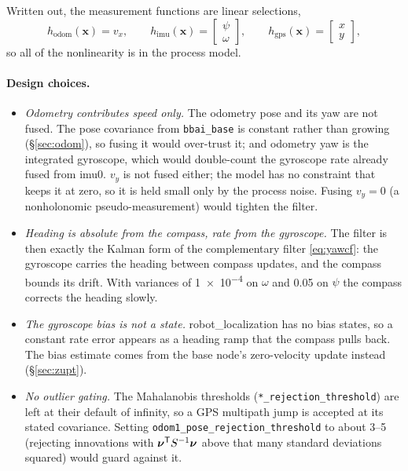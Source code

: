 Written out, the measurement functions are linear selections,
\begin{equation}
h_{\mathrm{odom}}(\bm x)=v_x,\qquad
h_{\mathrm{imu}}(\bm x)=\begin{bmatrix}\psi\\\omega\end{bmatrix},\qquad
h_{\mathrm{gps}}(\bm x)=\begin{bmatrix}x\\y\end{bmatrix},
\end{equation}
so all of the nonlinearity is in the process model.

\paragraph{Design choices.}
\begin{itemize}
\item \emph{Odometry contributes speed only.} The odometry pose and its yaw
  are not fused. The pose covariance from \texttt{bbai\_base} is constant
  rather than growing (\S\ref{sec:odom}), so fusing it would over-trust it;
  and odometry yaw is the integrated gyroscope, which would double-count the
  gyroscope rate already fused from imu0. $v_y$ is not fused either; the
  model has no constraint that keeps it at zero, so it is held small only by
  the process noise. Fusing $v_y=0$ (a nonholonomic pseudo-measurement) would
  tighten the filter.
\item \emph{Heading is absolute from the compass, rate from the gyroscope.} The
  filter is then exactly the Kalman form of the complementary filter
  \eqref{eq:yawcf}: the gyroscope carries the heading between compass
  updates, and the compass bounds its drift. With variances of
  \SI{1e-4}{} on $\omega$ and \SI{0.05}{} on $\psi$ the compass corrects the
  heading slowly.
\item \emph{The gyroscope bias is not a state.} robot\_localization has no bias
  states, so a constant rate error appears as a heading ramp that the compass
  pulls back. The bias estimate comes from the base node's zero-velocity
  update instead (\S\ref{sec:zupt}).
\item \emph{No outlier gating.} The Mahalanobis thresholds
  (\texttt{*\_rejection\_threshold}) are left at their default of infinity,
  so a GPS multipath jump is accepted at its stated covariance. Setting
  \texttt{odom1\_pose\_rejection\_threshold} to about 3--5 (rejecting
  innovations with $\bm\nu^{\mathsf T} S^{-1}\bm\nu$ above that many standard
  deviations squared) would guard against it.
\end{itemize}

